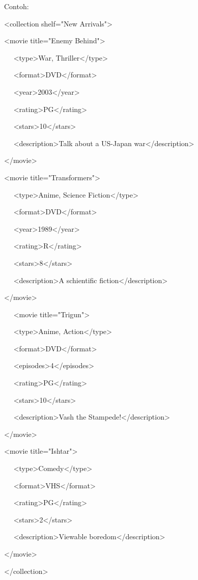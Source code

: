 \documentclass{wileySix}
\begin{document}
\vspace{12pt}
\vspace{12pt}
\noindent 
Contoh: \par
\noindent 
<collection shelf="New Arrivals"> \par
\noindent 
<movie title="Enemy Behind"> \par
\noindent 
~~ <type>War, Thriller</type> \par
\noindent 
~~ <format>DVD</format> \par
\noindent 
~~ <year>2003</year> \par
\noindent 
~~ <rating>PG</rating> \par
\noindent 
~~ <stars>10</stars> \par
\noindent 
~~ <description>Talk about a US-Japan war</description> \par
\noindent 
</movie> \par
\noindent 
<movie title="Transformers"> \par
\noindent 
~~ <type>Anime, Science Fiction</type> \par
\noindent 
~~ <format>DVD</format> \par
\noindent 
~~ <year>1989</year> \par
\noindent 
~~ <rating>R</rating> \par
\noindent 
~~ <stars>8</stars> \par
\noindent 
~~ <description>A schientific fiction</description> \par
\noindent 
</movie> \par
\noindent 
~~ <movie title="Trigun"> \par
\noindent 
~~ <type>Anime, Action</type> \par
\noindent 
~~ <format>DVD</format> \par
\noindent 
~~ <episodes>4</episodes> \par
\noindent 
~~ <rating>PG</rating> \par
\noindent 
~~ <stars>10</stars> \par
\noindent 
~~ <description>Vash the Stampede!</description> \par
\noindent 
</movie> \par
\noindent 
<movie title="Ishtar"> \par
\noindent 
~~ <type>Comedy</type> \par
\noindent 
~~ <format>VHS</format> \par
\noindent 
~~ <rating>PG</rating> \par
\noindent 
~~ <stars>2</stars> \par
\noindent 
~~ <description>Viewable boredom</description> \par
\noindent 
</movie> \par
\noindent 
</collection> \par
\vspace{10pt}
\noindent
\end{document}
